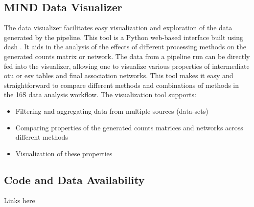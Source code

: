   \subsection*{MIND Data Visualizer}

    The data visualizer facilitates easy visualization and exploration of the data generated by the pipeline.
    This tool is a Python web-based interface built using dash \cite{dash}.
    It aids in the analysis of the effects of different processing methods on the generated counts matrix or network.
    The data from a pipeline run can be directly fed into the visualizer, allowing one to visualize various properties of intermediate \ac{otu} or \ac{esv} tables and final association networks.
    This tool makes it easy and straightforward to compare different methods and combinations of methods in the 16S data analysis workflow.
    The visualization tool supports:
    \begin{itemize}
      \item Filtering and aggregating data from multiple sources (data-sets)
      \item Comparing properties of the generated counts matrices and networks across different methods
      \item Visualization of these properties
    \end{itemize}

  \subsection*{Code and Data Availability}

    Links here
